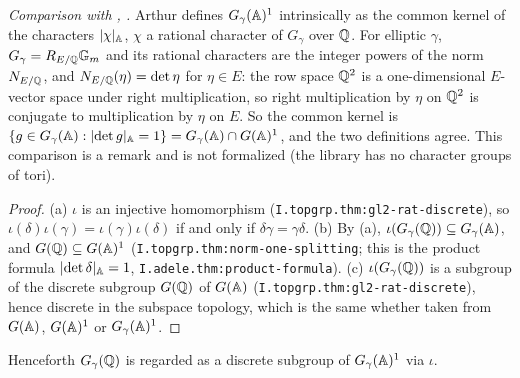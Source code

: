 \begin{definition}
\end{definition}
\noindent\emph{Comparison with \cite[§8]{A-I}, \cite[§10]{AIntro}.} Arthur defines $G_\gamma(\mathbb{A})^1$ intrinsically as the common kernel of the
characters $\lvert\chi\rvert_{\mathbb{A}}$, $\chi$ a rational character of $G_\gamma$ over $\mathbb{Q}$. For elliptic $\gamma$, $G_\gamma=R_{E/\mathbb{Q}}\mathbb G_m$ and its rational
characters are the integer powers of the norm $N_{E/\mathbb{Q}}$, and $N_{E/\mathbb{Q}}(\eta)=\det\eta$ for $\eta\in E$: the row space $\mathbb{Q}^2$ is a one-dimensional
$E$-vector space under right multiplication, so right multiplication by $\eta$ on $\mathbb{Q}^2$ is conjugate to multiplication by $\eta$ on $E$. So
the common kernel is $\{g\in G_\gamma(\mathbb{A}):\lvert\det g\rvert_{\mathbb{A}}=1\}=G_\gamma(\mathbb{A})\cap G(\mathbb{A})^1$, and the two definitions agree. This comparison is a remark
and is not formalized (the library has no character groups of tori).

\begin{theorem}
\end{theorem}
\begin{proof}
(a) $\iota$ is an injective homomorphism (\texttt{I.topgrp.thm:gl2-rat-discrete}), so $\iota(\delta)\iota(\gamma)=\iota(\gamma)\iota(\delta)$ if and only if
$\delta\gamma=\gamma\delta$. (b) By (a), $\iota(G_\gamma(\mathbb{Q}))\subseteq G_\gamma(\mathbb{A})$, and $G(\mathbb{Q})\subseteq G(\mathbb{A})^1$
(\texttt{I.topgrp.thm:norm-one-splitting}; this is the product formula $\lvert\det\delta\rvert_{\mathbb{A}}=1$, \texttt{I.adele.thm:product-formula}).
(c) $\iota(G_\gamma(\mathbb{Q}))$ is a subgroup of the discrete subgroup $G(\mathbb{Q})$ of $G(\mathbb{A})$ (\texttt{I.topgrp.thm:gl2-rat-discrete}), hence discrete in
the subspace topology, which is the same whether taken from $G(\mathbb{A})$, $G(\mathbb{A})^1$ or $G_\gamma(\mathbb{A})^1$.
\end{proof}
\noindent Henceforth $G_\gamma(\mathbb{Q})$ is regarded as a discrete subgroup of $G_\gamma(\mathbb{A})^1$ via $\iota$.

